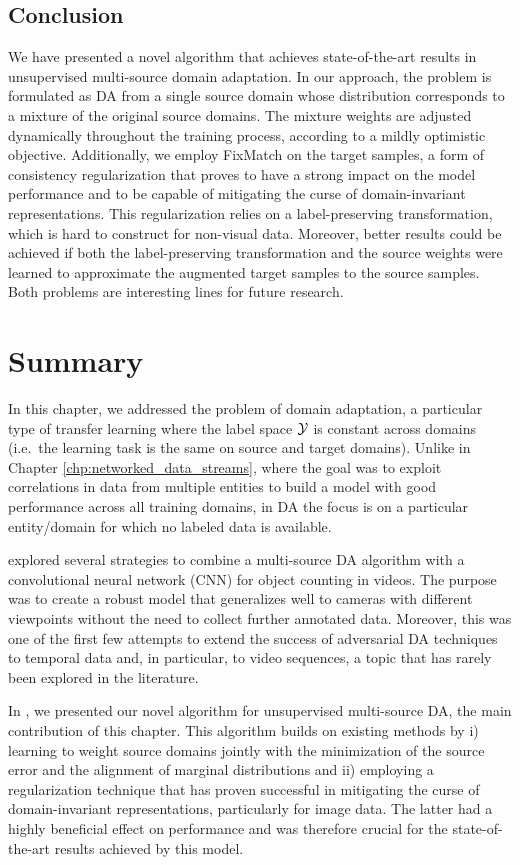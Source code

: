\subsection{Conclusion}
\label{sec:modafm_conclusion}
We have presented a novel algorithm that achieves state-of-the-art results in unsupervised multi-source domain adaptation. In our approach, the problem is formulated as DA from a single source domain whose distribution corresponds to a mixture of the original source domains. The mixture weights are adjusted dynamically throughout the training process, according to a mildly optimistic objective. Additionally, we employ FixMatch on the target samples, a form of consistency regularization that proves to have a strong impact on the model performance and to be capable of mitigating the curse of domain-invariant representations. This regularization relies on a label-preserving transformation, which is hard to construct for non-visual data. Moreover, better results could be achieved if both the label-preserving transformation and the source weights were learned to approximate the augmented target samples to the source samples. Both problems are interesting lines for future research.

\section{Summary}
\label{sec:da_summary}
In this chapter, we addressed the problem of domain adaptation, a particular type of transfer learning where the label space ${\mathcal{Y}}$ is constant across domains (i.e.\ the learning task is the same on source and target domains). Unlike in Chapter \ref{chp:networked_data_streams}, where the goal was to exploit correlations in data from multiple entities to build a model with good performance across all training domains, in DA the focus is on a particular entity/domain for which no labeled data is available.

 explored several strategies to combine a multi-source DA algorithm with a convolutional neural network (CNN) for object counting in videos. The purpose was to create a robust model that generalizes well to cameras with different viewpoints without the need to collect further annotated data. Moreover, this was one of the first few attempts to extend the success of adversarial DA techniques to temporal data and, in particular, to video sequences, a topic that has rarely been explored in the literature.

In , we presented our novel algorithm for unsupervised multi-source DA, the main contribution of this chapter. This algorithm builds on existing methods by i) learning to weight source domains jointly with the minimization of the source error and the alignment of marginal distributions and ii) employing a regularization technique that has proven successful in mitigating the curse of domain-invariant representations, particularly for image data. The latter had a highly beneficial effect on performance and was therefore crucial for the state-of-the-art results achieved by this model.